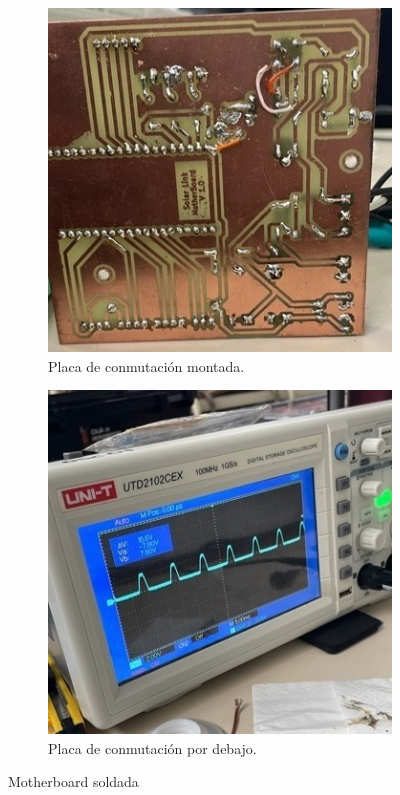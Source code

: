 \begin{figure}[H]

\begin{subfigure}{0.5\textwidth}
\includegraphics[width=0.9\linewidth]{informes/5CFF7EBD-CDA3-4D03-A99F-75DF5A4A2B68.jpg} 
\caption{Placa de conmutación montada.}
\end{subfigure}
\begin{subfigure}{0.5\textwidth}
\includegraphics[width=0.9\linewidth]{informes/626C4649-D7A2-47B6-B83B-4980D3383436.jpg}
\caption{Placa de conmutación por debajo.}
\end{subfigure}

\caption{Motherboard soldada}
\end{figure}

